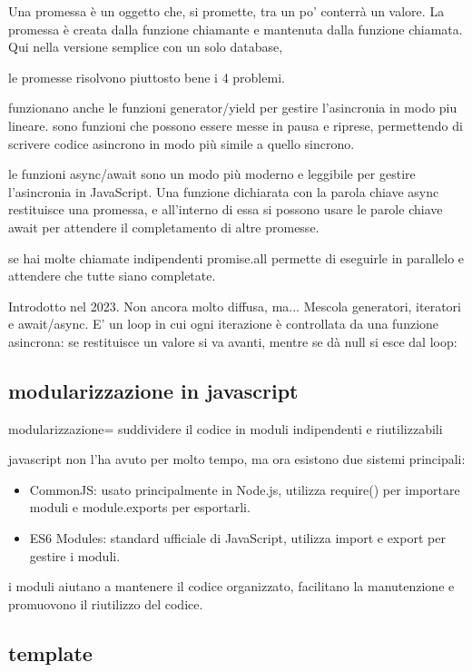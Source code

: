 \documentclass[12pt]{article}
\begin{document}
Una promessa è un oggetto che, si promette, tra un po' conterrà un valore. La
promessa è creata dalla funzione chiamante e mantenuta dalla funzione chiamata.
Qui nella versione semplice con un solo database,

le promesse risolvono piuttosto bene i 4 problemi.

funzionano anche le funzioni generator/yield per gestire l'asincronia in modo piu lineare.
sono funzioni che possono essere messe in pausa e riprese, permettendo di scrivere codice asincrono in modo più simile a quello sincrono.

le funzioni async/await sono un modo più moderno e leggibile per gestire l'asincronia in JavaScript. Una funzione dichiarata con la parola chiave async restituisce una promessa, e all'interno di essa si possono usare le parole chiave await per attendere il completamento di altre promesse.

se hai molte chiamate indipendenti promise.all permette di eseguirle in parallelo e attendere che tutte siano completate.

Introdotto nel 2023. Non ancora molto diffusa, ma...
Mescola generatori, iteratori e await/async.
 E' un loop in cui ogni iterazione è controllata da una funzione asincrona: se
restituisce un valore si va avanti, mentre se dà null si esce dal loop:\\

\subsection{modularizzazione in javascript}

modularizzazione= suddividere il codice in moduli indipendenti e riutilizzabili

javascript non l'ha avuto per molto tempo, ma ora esistono due sistemi principali:
\begin{itemize} 
    \item CommonJS: usato principalmente in Node.js, utilizza require() per importare moduli e module.exports per esportarli.
    \item ES6 Modules: standard ufficiale di JavaScript, utilizza import e export per gestire i moduli.
    \end{itemize}

    i moduli aiutano a mantenere il codice organizzato, facilitano la manutenzione e promuovono il riutilizzo del codice.

    \subsection{template}
\end{document}
